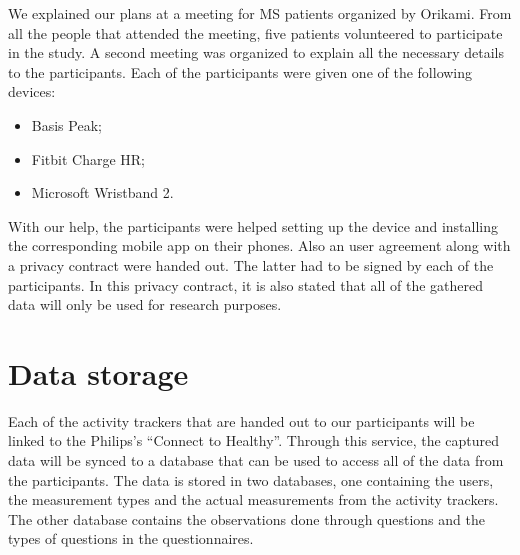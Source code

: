 %
We explained our plans at a meeting for MS patients organized by Orikami.
From all the people that attended the meeting, five patients volunteered to participate in the study.
A second meeting was organized to explain all the necessary details to the participants.
Each of the participants were given one of the following devices:
%
\begin{itemize}
	\item Basis Peak;
	\item Fitbit Charge HR;
	\item Microsoft Wristband 2.
\end{itemize}
%
With our help, the participants were helped setting up the device and installing the corresponding mobile app on their phones.
Also an user agreement along with a privacy contract were handed out.
The latter had to be signed by each of the participants.
In this privacy contract, it is also stated that all of the gathered data will only be used for research purposes.

\section{Data storage} \label{section: Data storage}
Each of the activity trackers that are handed out to our participants will be linked to the Philips's ``Connect to Healthy''.
Through this service, the captured data will be synced to a database that can be used to access all of the data from the participants.
The data is stored in two databases, one containing the users, the measurement types and the actual measurements from the activity trackers. 
The other database contains the observations done through questions and the types of questions in the questionnaires.